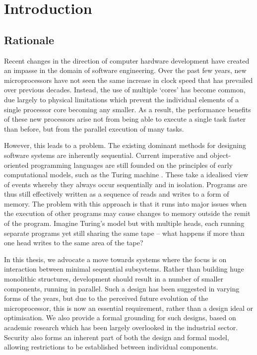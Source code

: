 \chapter{Introduction}
\label{introduction}

\section{Rationale}

Recent changes in the direction of computer hardware development have
created an impasse in the domain of software engineering.  Over the
past few years, new microprocessors have not seen the same increase in
clock speed that has prevailed over previous decades.  Instead, the
use of multiple `cores' has become common, due largely to physical
limitations which prevent the individual elements of a single
processor core becoming any smaller.  As a result, the performance
benefits of these new processors arise not from being able to execute
a single task faster than before, but from the parallel execution of
many tasks.

However, this leads to a problem.  The existing dominant methods for
designing software systems are inherently sequential.  Current
imperative and object-oriented programming languages are still founded
on the principles of early computational models, such as the Turing
machine \cite{turing:36}.  These take a idealised view of events
whereby they always occur sequentially and in isolation.  Programs are
thus still effectively written as a sequence of reads and writes to a
form of memory.  The problem with this approach is that it runs into
major issues when the execution of other programs may cause changes to
memory outside the remit of the program.  Imagine Turing's model but
with multiple heads, each running separate programs yet still sharing
the same tape -- what happens if more than one head writes to the same
area of the tape?

In this thesis, we advocate a move towards systems where the focus is
on interaction between minimal sequential subsystems.  Rather than
building huge monolithic structures, development should result in a
number of smaller components, running in parallel.  Such a design has
been suggested in varying forms of the years, but due to the perceived
future evolution of the microprocessor, this is now an essential
requirement, rather than a design ideal or optimisation.  We also
provide a formal grounding for such designs, based on academic
research which has been largely overlooked in the industrial sector.
Security also forms an inherent part of both the design and formal
model, allowing restrictions to be established between individual
components.


